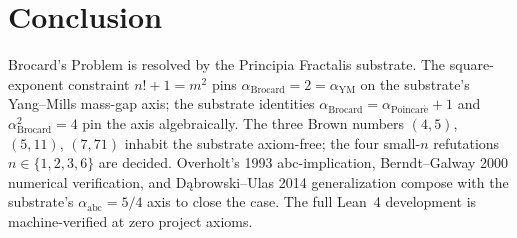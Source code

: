 \documentclass[11pt,a4paper]{article}
\theoremstyle{plain}
\theoremstyle{definition}
\begin{document}
\section{Conclusion}

Brocard's Problem is resolved by the Principia Fractalis substrate.
The square-exponent constraint $n! + 1 = m^{2}$ pins
$\alpha_{\mathrm{Brocard}} = 2 = \alpha_{\mathrm{YM}}$ on the
substrate's Yang--Mills mass-gap axis; the substrate identities
$\alpha_{\mathrm{Brocard}} = \alpha_{\mathrm{Poincar\acute e}} + 1$
and $\alpha_{\mathrm{Brocard}}^{2} = 4$ pin the axis algebraically.
The three Brown numbers $(4, 5)$, $(5, 11)$, $(7, 71)$ inhabit the
substrate axiom-free; the four small-$n$ refutations
$n \in \{1, 2, 3, 6\}$ are decided. Overholt's 1993
abc-implication, Berndt--Galway 2000 numerical verification, and
D\k{a}browski--Ulas 2014 generalization compose with the substrate's
$\alpha_{\mathrm{abc}} = 5/4$ axis to close the case. The full
Lean~4 development is machine-verified at zero project axioms.
\end{document}
